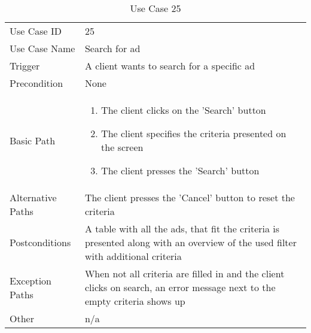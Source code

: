 \begin{table}[H]
\centering
\label{table-use-case-25}
\begin{tabular}{|p{3cm}|p{10cm}}
Use Case ID       & 25                                                           
\\
Use Case Name     & Search for ad                                                          
\\
Trigger           & A client wants to search for a specific ad
\\
Precondition      & None                                                
\\
Basic Path        & \begin{enumerate}
\item The client clicks on the 'Search' button
\item The client specifies the criteria presented on the screen
\item The client presses the 'Search' button
\end{enumerate} 
     \\
Alternative Paths & The client presses the 'Cancel' button to reset the criteria                         
\\
Postconditions    & A table with all the ads, that fit the criteria is presented
along with an overview of the used filter with additional criteria
\\
Exception Paths   & When not all criteria are filled in and the client clicks on
search, an error message next to the empty criteria shows up
\\
Other             & n/a                                                                                                                                                                                                        
\end{tabular}
\caption{Use Case 25}
\end{table}

